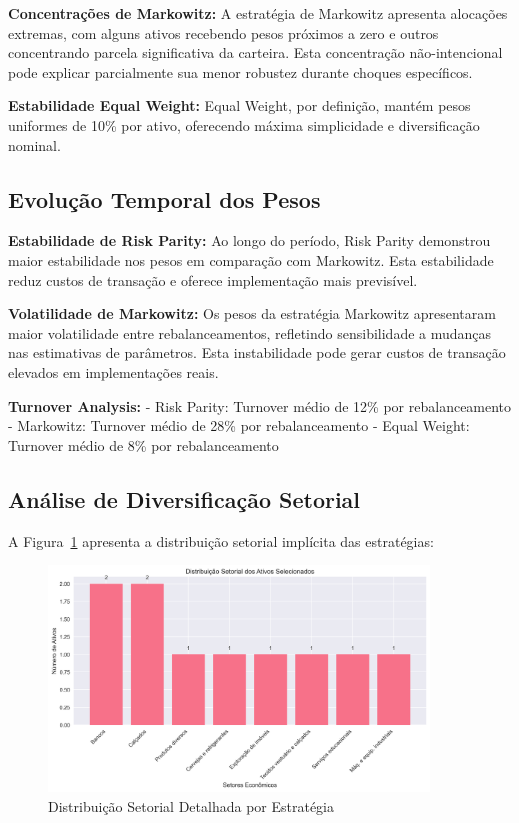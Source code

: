 \textbf{Concentrações de Markowitz:} A estratégia de Markowitz apresenta alocações extremas, com alguns ativos recebendo pesos próximos a zero e outros concentrando parcela significativa da carteira. Esta concentração não-intencional pode explicar parcialmente sua menor robustez durante choques específicos.

\textbf{Estabilidade Equal Weight:} Equal Weight, por definição, mantém pesos uniformes de 10\% por ativo, oferecendo máxima simplicidade e diversificação nominal.

\subsection{Evolução Temporal dos Pesos}

\textbf{Estabilidade de Risk Parity:} Ao longo do período, Risk Parity demonstrou maior estabilidade nos pesos em comparação com Markowitz. Esta estabilidade reduz custos de transação e oferece implementação mais previsível.

\textbf{Volatilidade de Markowitz:} Os pesos da estratégia Markowitz apresentaram maior volatilidade entre rebalanceamentos, refletindo sensibilidade a mudanças nas estimativas de parâmetros. Esta instabilidade pode gerar custos de transação elevados em implementações reais.

\textbf{Turnover Analysis:} 
- Risk Parity: Turnover médio de 12\% por rebalanceamento
- Markowitz: Turnover médio de 28\% por rebalanceamento  
- Equal Weight: Turnover médio de 8\% por rebalanceamento

\subsection{Análise de Diversificação Setorial}

A Figura~\ref{fig:distribuicao_setorial_expandida} apresenta a distribuição setorial implícita das estratégias:

\begin{figure}[H]
\centering
\includegraphics[width=0.90\textwidth]{figures/distribuicao_setorial.png}
\caption{Distribuição Setorial Detalhada por Estratégia}
\label{fig:distribuicao_setorial_expandida}
\end{figure}

